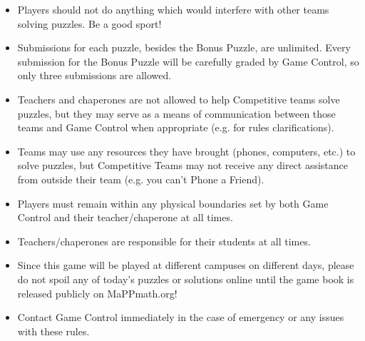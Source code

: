 \begin{itemize}
\item Players should not do anything which
would interfere with other teams solving puzzles. Be a good sport!
\item Submissions for each puzzle, besides the Bonus Puzzle, are unlimited.
Every submission for the Bonus Puzzle will be carefully graded by Game Control,
so only three submissions are allowed.
\item Teachers and chaperones are not allowed to help Competitive teams solve
puzzles, but they may serve as a means of communication between those teams and
Game Control when appropriate (e.g. for rules clarifications).
\item Teams may use any resources they have brought (phones, computers, etc.)
to solve puzzles, but Competitive Teams may not receive any direct
assistance from outside their team (e.g. you can't Phone a Friend).
\item Players must remain within any physical boundaries set by both
Game Control and their teacher/chaperone at all times.
\item Teachers/chaperones are responsible for their students at
all times.
\item Since this game will be played at different campuses on different
days, please do not spoil any of today's puzzles or solutions online until
the game book is released publicly on MaPPmath.org!
\item Contact Game Control immediately in the case of emergency
or any issues with these rules.
\end{itemize}

